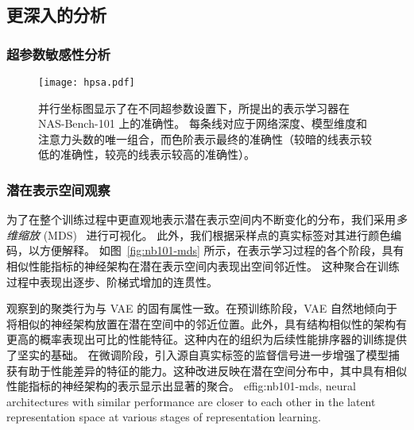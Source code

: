 \documentclass[../main_zh.tex]{subfiles}
\begin{document}
\subsection{更深入的分析}

\subsubsection{超参数敏感性分析}\label{sec:hyperparam-analysis}

\begin{figure}
  \centering
  \texttt{[image: hpsa.pdf]}
  \DiffBegin
  \caption{
    并行坐标图显示了在不同超参数设置下，所提出的表示学习器在 NAS-Bench-101 上的准确性。
    每条线对应于网络深度、模型维度和注意力头数的唯一组合，而色阶表示最终的准确性（较暗的线表示较低的准确性，较亮的线表示较高的准确性）。
  }\label{fig:hyperparam-sensitivity}
  \DiffEnd
\end{figure}

\subsubsection{潜在表示空间观察}\label{sec:repre-space-analysis}

为了在整个训练过程中更直观地表示潜在表示空间内不断变化的分布，我们采用\textit{多维缩放} (MDS)~\cite{DOUGLASCARROLL1998179} 进行可视化。
此外，我们根据采样点的真实标签对其进行颜色编码，以方便解释。
如图~\ref{fig:nb101-mds} 所示，在表示学习过程的各个阶段，具有相似性能指标的神经架构在潜在表示空间内表现出空间邻近性。
这种聚合在训练过程中表现出逐步、阶梯式增加的连贯性。

观察到的聚类行为与 VAE 的固有属性一致。在预训练阶段，VAE 自然地倾向于将相似的神经架构放置在潜在空间中的邻近位置。此外，具有结构相似性的架构有更高的概率表现出可比的性能特征。这种内在的组织为后续性能排序器的训练提供了坚实的基础。
在微调阶段，引入源自真实标签的监督信号进一步增强了模型捕获有助于性能差异的特征的能力。这种改进反映在潜在空间分布中，其中具有相似性能指标的神经架构的表示显示出显著的聚合。
ef{fig:nb101-mds}, neural architectures with similar performance are closer to each other in the latent representation space at various stages of representation learning.
\end{document}
